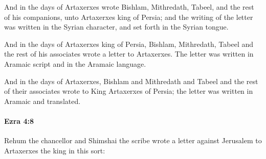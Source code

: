 			\begin{versebox}
					\item[BHS] 
					\item[LXX] 
					\item[ASV] And in the days of Artaxerxes wrote Bishlam, Mithredath, Tabeel, and the rest of his companions, unto Artaxerxes king of Persia; and the writing of the letter was written in the Syrian character, and set forth in the Syrian tongue.
					\item[NIV] And in the days of Artaxerxes king of Persia, Bishlam, Mithredath, Tabeel and the rest of his associates wrote a letter to Artaxerxes. The letter was written in Aramaic script and in the Aramaic language.
					\item[NRSV] And in the days of Artaxerxes, Bishlam and Mithredath and Tabeel and the rest of their associates wrote to King Artaxerxes of Persia; the letter was written in Aramaic and translated.
			\end{versebox}

		\paragraph{Ezra 4:8} %
			\label{EZRA-4-8}

			Rehum the chancellor and Shimshai the scribe wrote a letter against Jerusalem to Artaxerxes the king in this sort:

